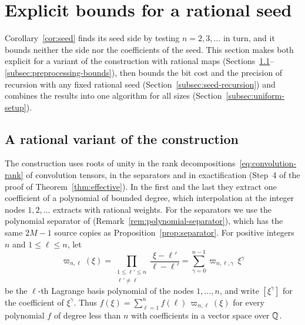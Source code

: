 \section{Explicit bounds for a rational seed}
\label{sec:seed-bounds}

Corollary~\ref{cor:seed} finds its seed side by testing
\(n=2,3,\ldots\) in turn, and it bounds neither the side nor the
coefficients of the seed. This section makes both explicit for a
variant of the construction with rational maps
(Sections~\ref{subsec:rational-variant}--\ref{subsec:preprocessing-bounds}),
then bounds the bit cost and the precision of recursion with any fixed
rational seed (Section~\ref{subsec:seed-recursion}) and combines the
results into one algorithm for all sizes
(Section~\ref{subsec:uniform-setup}).

\subsection{A rational variant of the construction}
\label{subsec:rational-variant}

The construction uses roots of unity in the rank
decompositions~\eqref{eq:convolution-rank} of convolution tensors, in
the separators and in exactification (Step~4 of the proof of
Theorem~\ref{thm:effective}). In the first and the last they extract one
coefficient of a polynomial of bounded degree, which interpolation at
the integer nodes \(1,2,\ldots\) extracts with rational weights. For
the separators we use the polynomial separator of
\citet[Proposition~2.1]{Lu26} (Remark~\ref{rem:polynomial-separator}),
which has the same \(2M-1\) source copies as
Proposition~\ref{prop:separator}. For positive integers \(n\) and
\(1\le\ell\le n\), let
\[
 \varpi_{n,\ell}(\xi)=\prod_{\substack{1\le\ell'\le n\\ \ell'\ne\ell}}
   \frac{\xi-\ell'}{\ell-\ell'}
 =\sum_{\gamma=0}^{n-1}\varpi_{n,\ell,\gamma}\,\xi^\gamma
\]
be the \(\ell\)-th Lagrange basis polynomial of the nodes
\(1,\ldots,n\), and write \([\xi^\gamma]\) for the coefficient of
\(\xi^\gamma\). Thus \(f(\xi)=\sum_{\ell=1}^nf(\ell)\,\varpi_{n,\ell}(\xi)\)
for every polynomial \(f\) of degree less than \(n\) with coefficients
in a vector space over \(\mathbb Q\).

